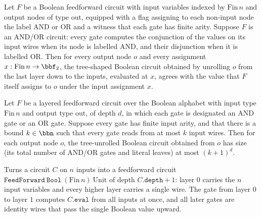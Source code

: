 \begin{theorem}
\label{BoolCircuit.FeedForward.toCircuit_eval}
\leanok
{}
Let $F$ be a Boolean feedforward circuit with input variables indexed by
$\mathrm{Fin}\,n$ and output nodes of type $\mathrm{out}$, equipped with a flag
assigning to each non-input node the label AND or OR and a witness that each gate has
finite arity. Suppose $F$ is an AND/OR circuit: every gate computes the conjunction of
the values on its input wires when its node is labelled AND, and their disjunction when
it is labelled OR. Then for every output node $o$ and every assignment $x :
\mathrm{Fin}\,n \to \bbf_2$, the tree-shaped Boolean circuit obtained by unrolling $o$
from the last layer down to the inputs, evaluated at $x$, agrees with the value that $F$
itself assigns to $o$ under the input assignment $x$.
\end{theorem}

\begin{theorem}
\label{BoolCircuit.FeedForward.toCircuit_size_le}
\leanok
{}
Let $F$ be a layered feedforward circuit over the Boolean alphabet with input type
$\mathrm{Fin}\,n$ and output type $\mathrm{out}$, of depth $d$, in which each gate is
designated an AND gate or an OR gate. Suppose every gate has finite input arity, and
that there is a bound $k \in \bbn$ such that every gate reads from at most $k$ input
wires. Then for each output node $o$, the tree-unrolled Boolean circuit obtained from
$o$ has size (its total number of AND/OR gates and literal leaves) at most $(k+1)^{d}$.
\end{theorem}

\begin{definition}
\label{BoolCircuit.Circuit.toFeedForward}
\leanok
{}
Turns a circuit $C$ on $n$ inputs into a feedforward circuit
$\texttt{FeedForward}\ \texttt{Bool}\ (\mathrm{Fin}\,n)\ \mathrm{Unit}$ of depth
$C.\texttt{depth} + 1$: layer $0$ carries the $n$ input variables and every higher
layer carries a single wire. The gate from layer $0$ to layer $1$ computes
$C.\texttt{eval}$ from all inputs at once, and all later gates are identity wires
that pass the single Boolean value upward.
\end{definition}

